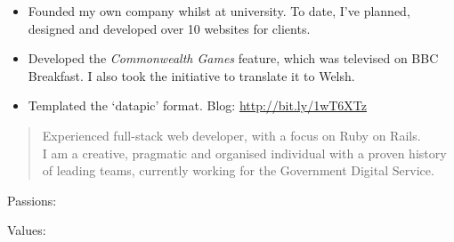 \documentclass[10pt,a4paper,ragged2e,withhyper]{altacv}
\begin{document}
\begin{paracol}{2}
\begin{itemize}
    \item Founded my own company whilst at university. To date, I've planned, designed and developed over 10 websites for clients.
\end{itemize}

\divider


\begin{itemize}
    \item Developed the \emph{Commonwealth Games} feature, which was televised on BBC Breakfast. I also took the initiative to translate it to Welsh.
    \item Templated the ‘datapic’ format. Blog: \url{http://bit.ly/1wT6XTz}
\end{itemize}


\nocite{*}

\printbibliography[heading=pubtype,title={\printinfo{\faUsers}{Talks}},type=inproceedings]


\printbibliography[heading=pubtype,title={\printinfo{\faBook}{Books}},type=book]


\printbibliography[heading=pubtype,title={\printinfo{\faFile*[regular]}{Articles}}, type=misc]


\switchcolumn

\begin{quote}
Experienced full-stack web developer, with a focus on Ruby on Rails.
\\ \medskip
I am a creative, pragmatic and organised individual with a proven history of leading teams, currently working for the Government Digital Service.
\end{quote}

\bigskip

Passions:

\medskip

Values:
\hspace{2mm} %



\end{paracol}
\end{document}

